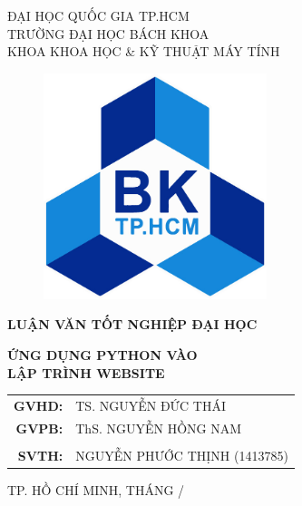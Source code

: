 \begin{titlepage}
	\begin{center}
		\large ĐẠI HỌC QUỐC GIA TP.HCM\\TRƯỜNG ĐẠI HỌC BÁCH KHOA\\KHOA KHOA HỌC \& KỸ THUẬT MÁY TÍNH
	\end{center}
	\begin{figure}[!ht]
		\begin{center}
			\includegraphics[width=65mm]{images/logobk.jpg}
		\end{center}
	\end{figure}
	\begin{center}
		\textbf{\large LUẬN VĂN TỐT NGHIỆP ĐẠI HỌC}
	\end{center}
	\vspace{5mm}
	\begin{center}
		\textbf{\Huge ỨNG DỤNG PYTHON VÀO\\LẬP TRÌNH WEBSITE}
	\end{center}
	\vspace{5mm}
	\begin{table}[!ht]
		\raggedleft
		\large
		\begin{tabular}{rl}
			\textbf{GVHD:} & TS. NGUYỄN ĐỨC THÁI\\
			\textbf{GVPB:} & ThS. NGUYỄN HỒNG NAM\\
			\\
			\textbf{SVTH:} & NGUYỄN PHƯỚC THỊNH (1413785)\\
		\end{tabular}
	\end{table}
	\vfill
	\begin{center}
		\large TP. HỒ CHÍ MINH, THÁNG \the\month /\the\year
	\end{center}
\end{titlepage}
